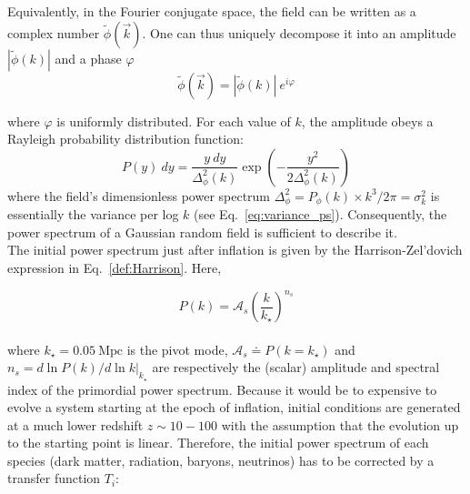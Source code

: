 Equivalently, in the Fourier conjugate space, the field can be written as a complex number $\tilde{\phi}(\vec{k})$. One can thus uniquely decompose it into an amplitude $\left\vert \tilde{\phi}(k) \right\vert$ and a phase $\varphi$
\begin{equation}
\label{eq:veckphi}
\tilde{\phi}(\vec{k}) = \left\vert \tilde{\phi}(k) \right\vert~e^{i \varphi}
\end{equation}

where $\varphi$ is uniformly distributed. For each value of $k$, the amplitude obeys a Rayleigh probability
distribution function:
\begin{equation}
P(y)~dy = \frac{y ~dy}{\Delta_\phi^2(k)} \exp \left( - \frac{y^2}{2\Delta_\phi^2(k)} \right)
\end{equation} where the field's dimensionless power spectrum $\Delta_\phi^2 = P_\phi (k) \times k^3/2\pi = \sigma_k^2$ is essentially the variance per log $k$ (see Eq.~\ref{eq:variance_ps}). Consequently, the power spectrum of a Gaussian random field is sufficient to describe it. \\

The initial power spectrum just after inflation is given by the Harrison-Zel'dovich expression in Eq.~\ref{def:Harrison}. Here, 

\begin{equation}
P(k) = \mathcal{A}_s \left(\frac{k}{k_\star} \right)^{n_s}
\end{equation} \\ where $k_\star = 0.05~\mathrm{Mpc}$ is the pivot mode, $\mathcal{A}_s \doteq P(k=k_\star)$ and $n_s = \left. d\ln P(k)/d\ln k \right\vert_{k_\star}$ are respectively the (scalar) amplitude and spectral index of the primordial power spectrum. Because it would be to expensive to evolve a system starting at the epoch of inflation, initial conditions are generated at a much lower redshift $z\sim10-100$ with the assumption that the evolution up to the starting point is linear. Therefore, the initial power spectrum of each species (dark matter, radiation, baryons, neutrinos) has to be corrected by a transfer function $T_i$:

